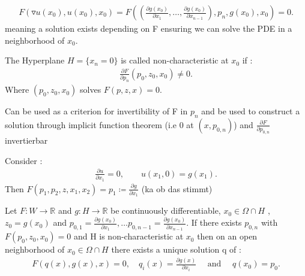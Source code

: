 \begin{align*}
  F(\triangledown u(x_0),u(x_0),x_0) = F((\frac{\partial g(x_0)}{\partial x_1},\ldots , \frac{\partial g(x_0)}{\partial x_{n-1}}),p_n,g(x_0),x_0) = 0
.\end{align*}
meaning a solution exists depending on F ensuring we can solve the PDE in a neighborhood of $x_0$. 
\begin{definition}
 The Hyperplane $H = \{x_n = 0\}  $  is called non-characteristic at $x_0$ if : 
 \begin{align*}
  \frac{\partial F}{\partial p_n}(p_0,z_0,x_0) \neq 0
 .\end{align*}
 Where $(p_0,z_0,x_0)$ solves $F(p,z,x) = 0$.
\end{definition}
Can be used as a criterion for invertibility  of F in $p_n$ and be used 
to construct a solution through implicit function theorem (i.e 0 at $(x,p_{0,n})$) and $\frac{\partial F}{\partial p_{0,n}}$ invertierbar
\begin{example}
  Consider : 
  \begin{align*}
    \frac{\partial u}{\partial x_1} = 0 , \qquad u(x_1,0) = g(x_1) 
  .\end{align*}
 Then $F(p_1,p_2,z,x_1,x_2) = p_1 \coloneqq  \frac{\partial g}{\partial x_1}$  (ka ob das stimmt)
\end{example}
\begin{lemma}
 Let $F : W \to  \mathbb{R}$  and $g : H \to  \mathbb{R}$ be continuously differentiable, $x_0 \in  \Omega \cap H$ , 
 $z_0 = g(x_0)$ and $p_{0,1} = \frac{\partial g(x_0)}{\partial x_1},\ldots p_{0,n-1} = \frac{\partial g(x_0)}{\partial x_{n-1}} $. If there exists $p_{0,n}$ with $F(p_0,z_0,x_0)=0$
 and H is non-characteristic at $x_0$ then on an open neighborhood of $x_0 \in  \Omega \cap H$ there exists a unique solution q of : 
 \begin{align*}
   F(q(x),g(x),x) = 0,\quad q_i(x)=\frac{\partial g(x)}{\partial x_i} \quad \text{ and } \quad q(x_0) = p_0
 .\end{align*}
\end{lemma}
